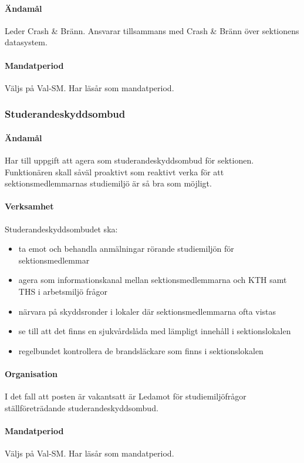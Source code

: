 \documentclass{dgovdoc}
\begin{document}
\paragraph{Ändamål}
Leder Crash & Bränn. Ansvarar tillsammans med Crash & Bränn över sektionens datasystem.

\paragraph{Mandatperiod}
Väljs på Val-SM. Har läsår som mandatperiod.

\subsubsection{Studerandeskyddsombud}

\paragraph{Ändamål}
Har till uppgift att agera som studerandeskyddsombud för sektionen. Funktionären skall såväl proaktivt som reaktivt verka för att sektionsmedlemmarnas studiemiljö är så bra som möjligt. 

\paragraph{Verksamhet}
Studerandeskyddsombudet ska:
\begin{itemize}
    \item ta emot och behandla anmälningar rörande studiemiljön för sektionsmedlemmar
    \item agera som informationskanal mellan sektionsmedlemmarna och KTH samt THS i arbetsmiljö frågor
    \item närvara på skyddsronder i lokaler där sektionsmedlemmarna ofta vistas
    \item se till att det finns en sjukvårdslåda med lämpligt innehåll i sektionslokalen
    \item regelbundet kontrollera de brandsläckare som finns i sektionslokalen
\end{itemize}

\paragraph{Organisation}
I det fall att posten är vakantsatt är Ledamot för studiemiljöfrågor ställföreträdande studerandeskyddsombud.

\paragraph{Mandatperiod}
Väljs på Val-SM. Har läsår som mandatperiod.
\end{document}
